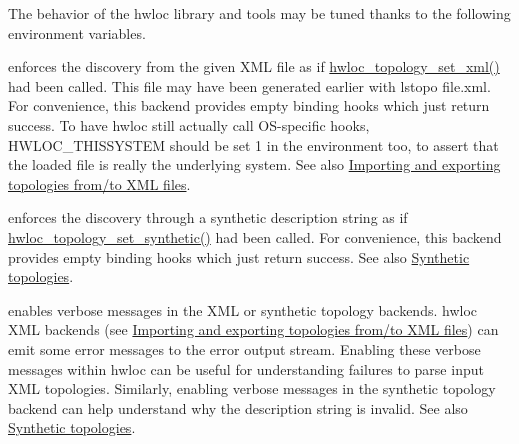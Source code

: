 

The behavior of the hwloc library and tools may be tuned thanks to the following environment variables.


\begin{DoxyDescription}
\item[H\+W\+L\+O\+C\+\_\+\+X\+M\+L\+F\+I\+LE=/path/to/file.xml ]enforces the discovery from the given X\+ML file as if \hyperlink{a00192_ga879439b7ee99407ee911b3ac64e9a25e}{hwloc\+\_\+topology\+\_\+set\+\_\+xml()} had been called. This file may have been generated earlier with lstopo file.\+xml. For convenience, this backend provides empty binding hooks which just return success. To have hwloc still actually call O\+S-\/specific hooks, H\+W\+L\+O\+C\+\_\+\+T\+H\+I\+S\+S\+Y\+S\+T\+EM should be set 1 in the environment too, to assert that the loaded file is really the underlying system. See also \hyperlink{a00388}{Importing and exporting topologies from/to X\+ML files}. 


\item[H\+W\+L\+O\+C\+\_\+\+S\+Y\+N\+T\+H\+E\+T\+IC=synthetic\+\_\+description ]enforces the discovery through a synthetic description string as if \hyperlink{a00192_ga4fab186bb6181a00bcf585825fddd38d}{hwloc\+\_\+topology\+\_\+set\+\_\+synthetic()} had been called. For convenience, this backend provides empty binding hooks which just return success. See also \hyperlink{a00389}{Synthetic topologies}. 


\item[H\+W\+L\+O\+C\+\_\+\+X\+M\+L\+\_\+\+V\+E\+R\+B\+O\+SE=1 ]
\item[H\+W\+L\+O\+C\+\_\+\+S\+Y\+N\+T\+H\+E\+T\+I\+C\+\_\+\+V\+E\+R\+B\+O\+SE=1 ]enables verbose messages in the X\+ML or synthetic topology backends. hwloc X\+ML backends (see \hyperlink{a00388}{Importing and exporting topologies from/to X\+ML files}) can emit some error messages to the error output stream. Enabling these verbose messages within hwloc can be useful for understanding failures to parse input X\+ML topologies. Similarly, enabling verbose messages in the synthetic topology backend can help understand why the description string is invalid. See also \hyperlink{a00389}{Synthetic topologies}. 



\end{DoxyDescription}
